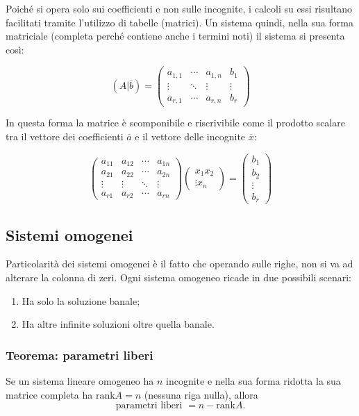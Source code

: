 \documentclass[x11names]{article}
\begin{document}
Poiché si opera solo sui coefficienti e non sulle incognite, i calcoli su essi risultano facilitati tramite l'utilizzo di tabelle (matrici). Un sistema quindi, nella sua forma matriciale (completa perché contiene anche i termini noti) il sistema si presenta così:

\[
\left(A|\overline{b}\right)=
\left(\begin{array}{ccc|c}
a_{1,1}&\cdots &a_{1,n}&b_{1} \\ \vdots &\ddots &\vdots  &\vdots \\ a_{r,1}&\cdots &a_{r,n}&b_{r}
\end{array}\right)
\] 

In questa forma la matrice è scomponibile e riscrivibile come il prodotto scalare tra il vettore dei coefficienti $\overline{a}$ e il vettore delle incognite $\overline{x}$:

\[
\begin{pmatrix}
a_{11}&a_{12}&\cdots &a_{1n}\\
a_{21}&a_{22}&\cdots &a_{2n}\\
\vdots &\vdots &\ddots &\vdots\\ 
a_{r1}&a_{r2}&\cdots &a_{rn}
\end{pmatrix}
\begin{pmatrix}x_{1}x_{2}\\
\vdots x_{n}
\end{pmatrix}=
\begin{pmatrix}
b_{1} \\
b_{2} \\
\vdots\\ 
b_{r}
\end{pmatrix}
\]

\subsection{Sistemi omogenei}
Particolarità dei sistemi omogenei è il fatto che operando sulle righe, non si va ad alterare la colonna di zeri. Ogni sistema omogeneo ricade in due possibili scenari:

\begin{enumerate}
 	\item Ha solo la soluzione banale;
	 \item Ha altre infinite soluzioni oltre quella banale.
\end{enumerate}


\begin{center}
\colorbox{myred}{\begin{minipage}{5.75in}
\begin{redes}{}
\subsubsection{Teorema: parametri liberi}
Se un sistema lineare omogeneo ha $n$ incognite e nella sua forma ridotta la sua matrice completa ha  $\text{rank}A = n$ (nessuna riga nulla), allora
\[
\text{parametri liberi } = n - \text{rank}A
.\] 
\end{redes}
\end{minipage}}        
\end{center}
\end{document}
